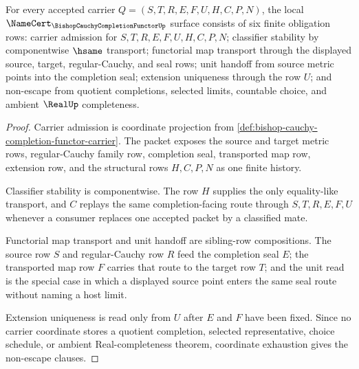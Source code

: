 \begin{theorem}
\label{thm:bishop-cauchy-completion-functor-namecert-obligations}
For every accepted carrier $Q=(S,T,R,E,F,U,H,C,P,N)$, the local $\NameCert_{\BishopCauchyCompletionFunctorUp}$ surface consists of six finite obligation rows: carrier admission for $S,T,R,E,F,U,H,C,P,N$; classifier stability by componentwise $\hsame$ transport; functorial map transport through the displayed source, target, regular-Cauchy, and seal rows; unit handoff from source metric points into the completion seal; extension uniqueness through the row $U$; and non-escape from quotient completions, selected limits, countable choice, and ambient $\RealUp$ completeness.
\end{theorem}
\begin{proof}
Carrier admission is coordinate projection from \autoref{def:bishop-cauchy-completion-functor-carrier}. The packet exposes the source and target metric rows, regular-Cauchy family row, completion seal, transported map row, extension row, and the structural rows $H,C,P,N$ as one finite history.

Classifier stability is componentwise. The row $H$ supplies the only equality-like transport, and $C$ replays the same completion-facing route through $S,T,R,E,F,U$ whenever a consumer replaces one accepted packet by a classified mate.

Functorial map transport and unit handoff are sibling-row compositions. The source row $S$ and regular-Cauchy row $R$ feed the completion seal $E$; the transported map row $F$ carries that route to the target row $T$; and the unit read is the special case in which a displayed source point enters the same seal route without naming a host limit.

Extension uniqueness is read only from $U$ after $E$ and $F$ have been fixed. Since no carrier coordinate stores a quotient completion, selected representative, choice schedule, or ambient Real-completeness theorem, coordinate exhaustion gives the non-escape clauses.
\end{proof}


